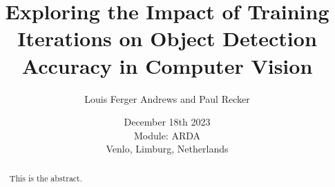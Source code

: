 \documentclass[]{report}
\title{Exploring the Impact of Training Iterations on Object Detection Accuracy in Computer Vision}
\author{Louis Ferger Andrews and Paul Recker}
\date{December 18th 2023 \\Module: ARDA \\Venlo, Limburg, Netherlands}
\begin{document}
\maketitle

\begin{abstract}
This is the abstract.

\end{abstract}

\tableofcontents
\setcounter{page}{3}
\listoffigures %
\pagebreak
{}	
	
 






\printbibliography[title=References]
\end{document}
